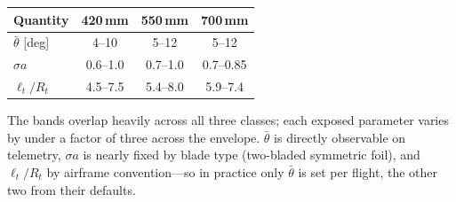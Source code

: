 \documentclass[11pt,a4paper]{article}
\newcommand{\Rt}{R_t}
\newcommand{\btheta}{\bar{\theta}}
\begin{document}
\begin{center}
\renewcommand{\arraystretch}{1.15}
\begin{tabular}{lccc}
\toprule
Quantity & 420\,mm & 550\,mm & 700\,mm \\
\midrule
\(\btheta\) [deg]   & 4--10          & 5--12          & 5--12          \\
\(\sigma a\)        & 0.6--1.0       & 0.7--1.0       & 0.7--0.85      \\
\(\ell_t/\Rt\)      & 4.5--7.5       & 5.4--8.0       & 5.9--7.4       \\
\bottomrule
\end{tabular}
\end{center}

\noindent The bands overlap heavily across all three classes; each
exposed parameter varies by under a factor of three across the
envelope. \(\btheta\) is directly observable on telemetry, \(\sigma a\)
is nearly fixed by blade type (two-bladed symmetric foil), and
\(\ell_t/\Rt\) by airframe convention---so in practice only
\(\btheta\) is set per flight, the other two from their defaults.
\end{document}

